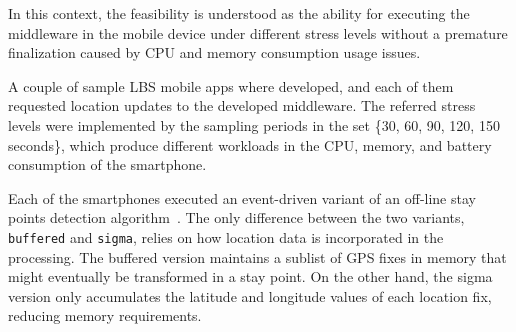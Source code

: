 \documentclass[ENG,PhD]{cinvestav}
\begin{document}
In this context, the feasibility is understood as the ability for executing the middleware in the mobile device under different stress levels without a premature finalization caused by CPU and memory consumption usage issues.

A couple of sample LBS mobile apps where developed, and each of them requested location updates to the developed middleware.
The referred stress levels were implemented by the sampling periods in the set \{30, 60, 90, 120, 150 seconds\}, which produce different workloads in the CPU, memory, and battery consumption of the smartphone.

Each of the smartphones executed an event-driven variant of an off-line stay points detection algorithm~\cite{Li2008,Ye2009,Perez-Torres2016b}.
The only difference between the two variants, \texttt{buffered} and \texttt{sigma}, relies on how location data is incorporated in the processing.
The buffered version maintains a sublist of GPS fixes in memory that might eventually be transformed in a stay point.
On the other hand, the sigma version only accumulates the latitude and longitude values of each location fix, reducing memory requirements.
\end{document}
